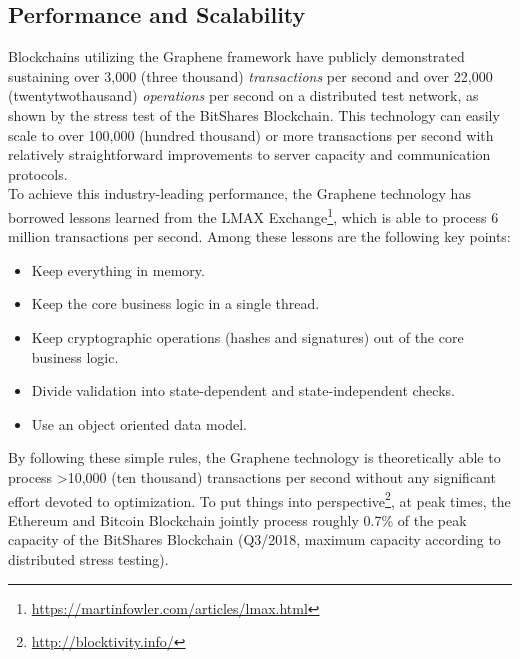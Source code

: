 \subsection{Performance and Scalability}
Blockchains utilizing the Graphene framework have publicly demonstrated sustaining over 3,000 (three thousand) \emph{transactions} per second and over 22,000 (twentytwothausand) \emph{operations} per second on a distributed test network, as shown by the stress test of the BitShares Blockchain. This technology can easily scale to over 100,000 (hundred thousand) or more transactions per second with relatively straightforward improvements to server capacity and communication protocols.\\
To achieve this industry-leading performance, the Graphene technology has borrowed lessons learned from the LMAX Exchange\footnote{\url{https://martinfowler.com/articles/lmax.html}}, which is able to process 6 million transactions per second. Among these lessons are the following  key  points:
\begin{itemize}
\item Keep  everything  in  memory.
\item Keep  the  core  business  logic  in  a   single  thread.
\item Keep  cryptographic  operations  (hashes  and  signatures)  out  of  the  core  business  logic.
\item Divide  validation  into  state-dependent  and  state-independent  checks.
\item Use  an  object  oriented  data  model.
\end{itemize}
By following these simple rules, the Graphene technology is theoretically able to process \textgreater 10,000 (ten thousand) transactions per second without any significant effort devoted to optimization. To put things into perspective\footnote{\url{http://blocktivity.info/}}, at peak times, the Ethereum and Bitcoin Blockchain jointly process roughly 0.7\% of the peak capacity of the BitShares Blockchain (Q3/2018, maximum capacity according to distributed stress testing).
